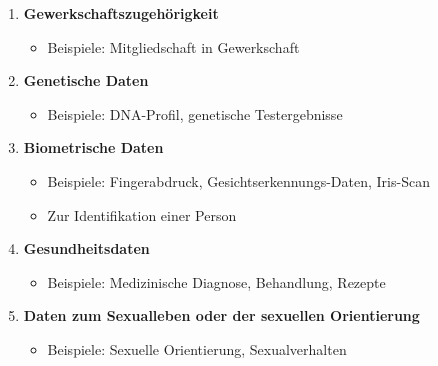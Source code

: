 \documentclass[12pt,a4paper]{article}
\begin{document}
\begin{tcolorbox}[colback=solutionbg, colframe=black!30]
\begin{enumerate}[1.]
    \item \textbf{Gewerkschaftszugehörigkeit}
    \begin{itemize}
        \item Beispiele: Mitgliedschaft in Gewerkschaft
    \end{itemize}
    
    \item \textbf{Genetische Daten}
    \begin{itemize}
        \item Beispiele: DNA-Profil, genetische Testergebnisse
    \end{itemize}
    
    \item \textbf{Biometrische Daten}
    \begin{itemize}
        \item Beispiele: Fingerabdruck, Gesichtserkennungs-Daten, Iris-Scan
        \item Zur Identifikation einer Person
    \end{itemize}
    
    \item \textbf{Gesundheitsdaten}
    \begin{itemize}
        \item Beispiele: Medizinische Diagnose, Behandlung, Rezepte
    \end{itemize}
    
    \item \textbf{Daten zum Sexualleben oder der sexuellen Orientierung}
    \begin{itemize}
        \item Beispiele: Sexuelle Orientierung, Sexualverhalten
    \end{itemize}
\end{enumerate}

\end{tcolorbox}
\end{document}
